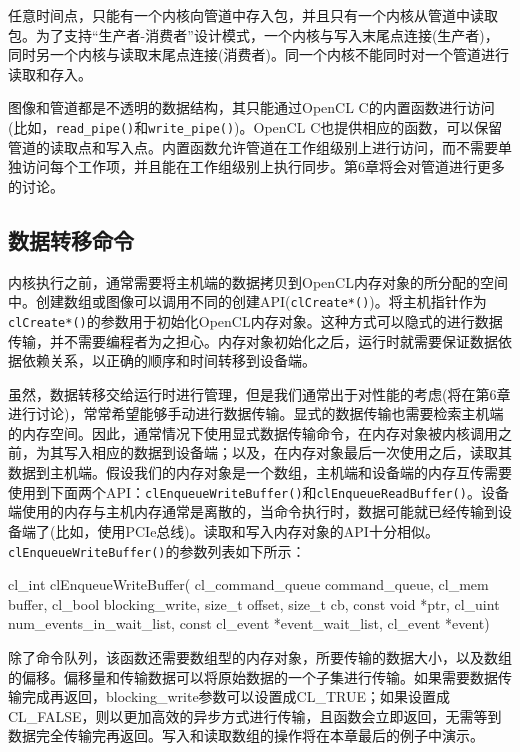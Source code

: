 任意时间点，只能有一个内核向管道中存入包，并且只有一个内核从管道中读取包。为了支持“生产者-消费者”设计模式，一个内核与写入末尾点连接(生产者)，同时另一个内核与读取末尾点连接(消费者)。同一个内核不能同时对一个管道进行读取和存入。

图像和管道都是不透明的数据结构，其只能通过OpenCL C的内置函数进行访问(比如，\texttt{read\_pipe()}和\texttt{write\_pipe()})。OpenCL C也提供相应的函数，可以保留管道的读取点和写入点。内置函数允许管道在工作组级别上进行访问，而不需要单独访问每个工作项，并且能在工作组级别上执行同步。第6章将会对管道进行更多的讨论。

\subsection{数据转移命令}

内核执行之前，通常需要将主机端的数据拷贝到OpenCL内存对象的所分配的空间中。创建数组或图像可以调用不同的创建API(\texttt{clCreate*()})。将主机指针作为\texttt{clCreate*()}的参数用于初始化OpenCL内存对象。这种方式可以隐式的进行数据传输，并不需要编程者为之担心。内存对象初始化之后，运行时就需要保证数据依据依赖关系，以正确的顺序和时间转移到设备端。

虽然，数据转移交给运行时进行管理，但是我们通常出于对性能的考虑(将在第6章进行讨论)，常常希望能够手动进行数据传输。显式的数据传输也需要检索主机端的内存空间。因此，通常情况下使用显式数据传输命令，在内存对象被内核调用之前，为其写入相应的数据到设备端；以及，在内存对象最后一次使用之后，读取其数据到主机端。假设我们的内存对象是一个数组，主机端和设备端的内存互传需要使用到下面两个API：\texttt{clEnqueueWriteBuffer()}和\texttt{clEnqueueReadBuffer()}。设备端使用的内存与主机内存通常是离散的，当命令执行时，数据可能就已经传输到设备端了(比如，使用PCIe总线)。读取和写入内存对象的API十分相似。\texttt{clEnqueueWriteBuffer()}的参数列表如下所示：

\begin{codebox}[cpp]
cl_int
clEnqueueWriteBuffer(
  cl_command_queue command_queue,
  cl_mem buffer,
  cl_bool blocking_write,
  size_t offset,
  size_t cb,
  const void *ptr,
  cl_uint num_events_in_wait_list,
  const cl_event *event_wait_list,
  cl_event *event)
\end{codebox}

除了命令队列，该函数还需要数组型的内存对象，所要传输的数据大小，以及数组的偏移。偏移量和传输数据可以将原始数据的一个子集进行传输。如果需要数据传输完成再返回，blocking\_\allowbreak{}write参数可以设置成CL\_\allowbreak{}TRUE；如果设置成CL\_\allowbreak{}FALSE，则以更加高效的异步方式进行传输，且函数会立即返回，无需等到数据完全传输完再返回。写入和读取数组的操作将在本章最后的例子中演示。

